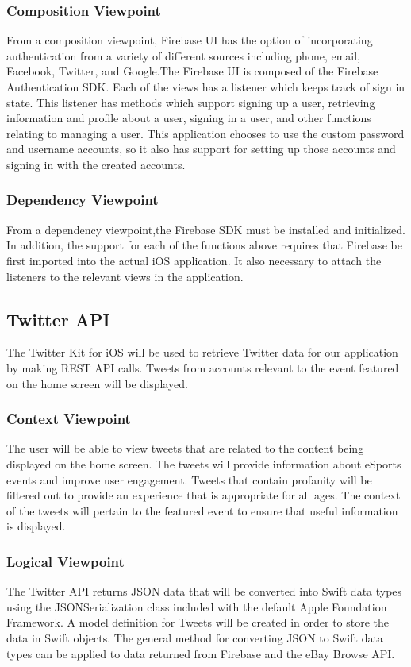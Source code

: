 \documentclass[onecolumn, draftclsnofoot,10pt, compsoc]{IEEEtran}
\begin{document}
\subsubsection{Composition Viewpoint}
From a composition viewpoint, Firebase UI has the option of incorporating authentication from a variety of different sources including phone, email, Facebook, Twitter, and Google.The Firebase UI is composed of the Firebase Authentication SDK. Each of the views has a listener which keeps track of sign in state. This listener has methods which support signing up a user, retrieving information and profile about a user, signing in a user, and other functions relating to managing a user. This application chooses to use the custom password and username accounts, so it also has support for setting up those accounts and signing in with the created accounts.
\subsubsection{Dependency Viewpoint}
From a dependency viewpoint,the Firebase SDK must be installed and initialized. In addition, the support for each of the functions above requires that Firebase be first imported into the actual iOS application. It also necessary to attach the listeners to the relevant views in the application. 

\subsection{Twitter API}
The Twitter Kit for iOS will be used to retrieve Twitter data for our application by making REST API calls\cite{twitter}. 
Tweets from accounts relevant to the event featured on the home screen will be displayed. 
\subsubsection{Context Viewpoint}
The user will be able to view tweets that are related to the content being displayed on the home screen. The tweets will provide information about eSports events and improve user engagement. Tweets that contain profanity will be filtered out to provide an experience that is appropriate for all ages. The context of the tweets will pertain to the featured event to ensure that useful information is displayed. 
\subsubsection{Logical Viewpoint}
The Twitter API returns JSON data that will be converted into Swift data types using the JSONSerialization class included with the default Apple Foundation Framework\cite{json}. 
A model definition for Tweets will be created in order to store the data in Swift objects. 
The general method for converting JSON to Swift data types can be applied to data returned from Firebase and the eBay Browse API.
\end{document}
